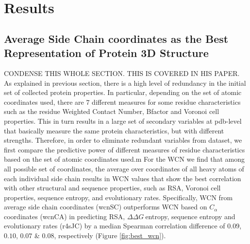 \documentclass[12pt]{article}
\newcommand{\ddg}{$\Delta\Delta G~$}
\begin{document}
\section{Results}
\label{sec:results}

    \subsection*{Average Side Chain coordinates as the Best Representation of Protein 3D Structure}
	{\color{red} CONDENSE THIS WHOLE SECTION. THIS IS COVERED IN HIS PAPER.}
        As explained in previous section, there is a high level of redundancy in the initial set of collected protein properties. In particular, depending on the set of atomic coordinates used, there are $7$ different measures for some residue characteristics such as the residue Weighted Contact Number, Bfactor and Voronoi cell properties. This in turn results in a large set of secondary variables at pdb-level that basically measure the same protein characteristics, but with different strengths.  Therefore, in order to eliminate redundant variables from dataset, we first compare the predictive power of different measures of residue characteristics based on the set of atomic coordinates used.m For the WCN we find that among all possible set of coordinates, the average over coordinates of all heavy atoms of each individual side chain results in WCN values that show the best correlation with other structural and sequence properties, such as RSA, Voronoi cell properties, sequence entropy, and evolutionary rates. Specifically, WCN from average side chain coordinates (wcnSC) outperforms WCN based on $C_\alpha$ coordinates (wcnCA) in predicting RSA, \ddg entropy, sequence entropy and evolutionary rates (r4sJC) by a median Spearman correlation difference of $0.09$, $0.10$, $0.07$ \& $0.08$, respectively (Figure \ref{fig:best_wcn}).\\ 
\end{document}
